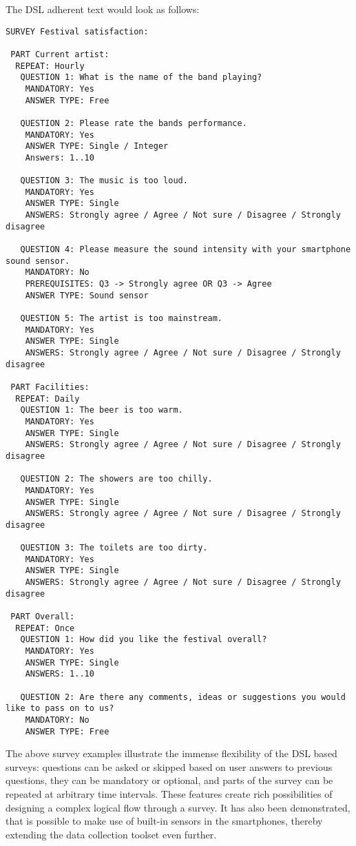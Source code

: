 The DSL adherent text would look as follows:
\begin{verbatim}
SURVEY Festival satisfaction:

 PART Current artist:
  REPEAT: Hourly
   QUESTION 1: What is the name of the band playing?
    MANDATORY: Yes
    ANSWER TYPE: Free
      
   QUESTION 2: Please rate the bands performance.
    MANDATORY: Yes
    ANSWER TYPE: Single / Integer
    Answers: 1..10

   QUESTION 3: The music is too loud.
    MANDATORY: Yes
    ANSWER TYPE: Single
    ANSWERS: Strongly agree / Agree / Not sure / Disagree / Strongly disagree
    
   QUESTION 4: Please measure the sound intensity with your smartphone sound sensor.
    MANDATORY: No
    PREREQUISITES: Q3 -> Strongly agree OR Q3 -> Agree
    ANSWER TYPE: Sound sensor
    
   QUESTION 5: The artist is too mainstream.
    MANDATORY: Yes
    ANSWER TYPE: Single
    ANSWERS: Strongly agree / Agree / Not sure / Disagree / Strongly disagree
    
 PART Facilities:
  REPEAT: Daily
   QUESTION 1: The beer is too warm.
    MANDATORY: Yes
    ANSWER TYPE: Single
    ANSWERS: Strongly agree / Agree / Not sure / Disagree / Strongly disagree
    
   QUESTION 2: The showers are too chilly.
    MANDATORY: Yes
    ANSWER TYPE: Single
    ANSWERS: Strongly agree / Agree / Not sure / Disagree / Strongly disagree
    
   QUESTION 3: The toilets are too dirty.
    MANDATORY: Yes
    ANSWER TYPE: Single
    ANSWERS: Strongly agree / Agree / Not sure / Disagree / Strongly disagree
    
 PART Overall:
  REPEAT: Once
   QUESTION 1: How did you like the festival overall?
    MANDATORY: Yes
    ANSWER TYPE: Single
    ANSWERS: 1..10
    
   QUESTION 2: Are there any comments, ideas or suggestions you would like to pass on to us?
    MANDATORY: No
    ANSWER TYPE: Free
\end{verbatim}

The above survey examples illustrate the immense flexibility of the DSL based surveys: questions can be asked or skipped based on user answers to previous questions, they can be mandatory or optional, and parts of the survey can be repeated at arbitrary time intervals. These features create rich possibilities of designing a complex logical flow through a survey. It has also been demonstrated, that is possible to make use of built-in sensors in the smartphones, thereby extending the data collection toolset even further.